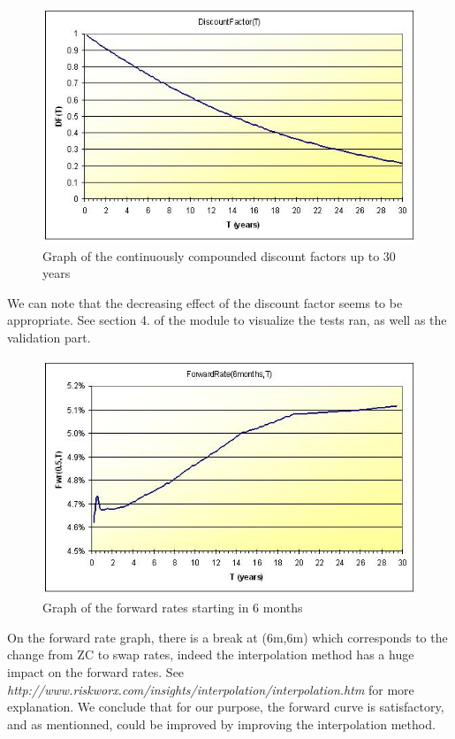 \begin{figure}[htbp]
\begin{center}
        \includegraphics[width=12cm]{DF.jpg}
        \caption{Graph of the continuously compounded discount factors up to 30 years}
\end{center}
\end{figure}

\par We can note that the decreasing effect of the discount factor seems to be appropriate. See section 4. of the module to visualize the tests ran, as well as the validation part.

\begin{figure}[htbp]
\begin{center}
        \includegraphics[width=12cm]{fwdRates.jpg}
        \caption{Graph of the forward rates starting in 6 months}
\end{center}
\end{figure}


\par On the forward rate graph, there is a break at (6m,6m) which corresponds to the change from ZC to swap rates, indeed the interpolation method has a huge impact on the forward rates. See \textit{http://www.riskworx.com/insights/interpolation/interpolation.htm} for more explanation. We conclude that for our purpose, the forward curve is satisfactory, and as mentionned, could be improved by improving the interpolation method.

